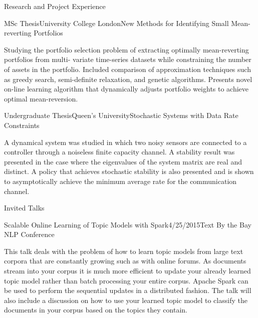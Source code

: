 \documentclass{resume}
\begin{document}
\begin{rSection}{Research and Project Experience}

\begin{rSubsection}{MSc Thesis}{University College London}{New Methods for Identifying Small Mean-reverting Portfolios}{}
\item Studying the portfolio selection problem of extracting optimally mean-reverting portfolios from multi-
variate time-series datasets while constraining the number of assets in the portfolio. Included comparison of approximation techniques such as greedy search, semi-definite relaxation, and genetic algorithms.
Presents novel on-line learning algorithm that dynamically adjusts portfolio weights to achieve optimal
mean-reversion.
\end{rSubsection}

\begin{rSubsection}{Undergraduate Thesis}{Queen's University}{Stochastic Systems with Data Rate Constraints}{}
\item A dynamical system was studied in which two noisy sensors are connected to a controller through a
noiseless finite capacity channel. A stability result was presented in the case where the eigenvalues of
the system matrix are real and distinct. A policy that achieves stochastic stability is also presented
and is shown to asymptotically achieve the minimum average rate for the communication channel. \\
\end{rSubsection}

\end{rSection}


\begin{rSection}{Invited Talks}

\begin{rSubsection}{Scalable Online Learning of Topic Models with Spark}{4/25/2015}{Text By the Bay NLP Conference}{}
\item This talk deals with the problem of how to learn topic models from large text corpora that are constantly growing such as with online forums. As documents stream into your corpus it is much more efficient to update your already learned topic model rather than batch processing your entire corpus. Apache Spark can be used to perform the sequential updates in a distributed fashion. The talk will also include a discussion on how to use your learned topic model to classify the documents in your corpus based on the topics they contain.\\
\end{rSubsection}
\end{rSection}
\end{document}
